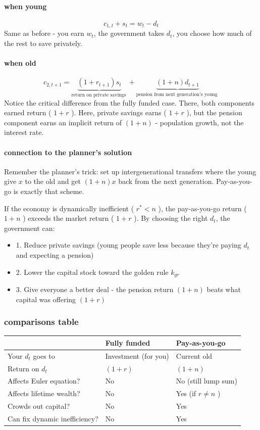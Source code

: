 \documentclass[12pt]{article}
\begin{document}
\paragraph{when young}
$$
c_{1, t}+s_t=w_t-d_t
$$
Same as before - you earn $w_t$, the government takes $d_t$, you choose how much of the rest to save privately.
\paragraph{when old}
$$
c_{2, t+1}=\underbrace{\left(1+r_{t+1}\right) s_t}_{\text {return on private savings }}+\underbrace{(1+n) d_{t+1}}_{\text {pension from next generation's young }}
$$
Notice the critical difference from the fully funded case. There, both components earned return ( $1+r$ ). Here, private savings earns ( $1+r$ ), but the pension component earns an implicit return of $(1+n)$ - population growth, not the interest rate.

\paragraph{connection to the planner's solution}
Remember the planner's trick: set up intergenerational transfers where the young give $x$ to the old and get $(1+n) x$ back from the next generation. Pay-as-you-go is exactly that scheme.

If the economy is dynamically inefficient ( $r^*<n$ ), the pay-as-you-go return ( $1+n$ ) exceeds the market return ( $1+r$ ). By choosing the right $d_t$, the government can:
\begin{itemize}
    \item 1. Reduce private savings (young people save less because they're paying $d_t$ and expecting a pension)
    \item 2. Lower the capital stock toward the golden rule $k_{g r}$
    \item 3. Give everyone a better deal - the pension return $(1+n)$ beats what capital was offering $(1+r)$
\end{itemize}

\subsubsection{comparisons table}
\begin{tabular}{|l|l|l|}
\hline & Fully funded & Pay-as-you-go \\
\hline Your $d_t$ goes to & Investment (for you) & Current old \\
\hline Return on $d_t$ & $(1+r)$ & $(1+n)$ \\
\hline Affects Euler equation? & No & No (still lump sum) \\
\hline Affects lifetime wealth? & No & Yes (if $r \neq n$ ) \\
\hline Crowds out capital? & No & Yes \\
\hline Can fix dynamic inefficiency? & No & Yes \\
\hline
\end{tabular}
\end{document}
